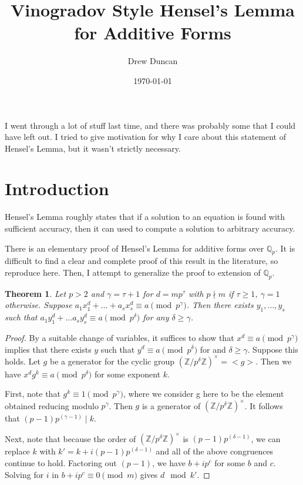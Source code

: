 \documentclass{article}
\title{Vinogradov Style Hensel's Lemma for Additive Forms}
\author{Drew Duncan}
\date{\today}
\newtheorem{theorem}{Theorem}
\begin{document}
\maketitle

I went through a lot of stuff last time, and there was probably some that I could have left out.  I tried to give motivation for why I care about this statement of Hensel's Lemma, but it wasn't strictly necessary.

\section{Introduction}
Hensel's Lemma roughly states that if a solution to an equation is found with sufficient accuracy, then it can used to compute a solution to arbitrary accuracy.

There is an elementary proof of Hensel's Lemma for additive forms over $\mathbb{Q}_p$.  It is difficult to find a clear and complete proof of this result in the literature, so reproduce here.  Then, I attempt to generalize the proof to extension of $\mathbb{Q}_p$.

\begin{theorem}
Let $p>2$ and  $\gamma = \tau+1$ for $d=m p^\tau$ with $p \nmid m$ if $\tau \ge 1$, $\gamma = 1$ otherwise.  Suppose $a_1 x_1^d + \ldots + a_s x_s^d \equiv a \pmod{p^\gamma}$.  Then there exists $y_1, \ldots, y_s$ such that $a_1 y_1^d + \ldots a_s y_s^d \equiv a \pmod{p^\delta}$ for any $\delta \ge \gamma$.
\end{theorem}

\begin{proof}
By a suitable change of variables, it suffices to show that $x^d \equiv a \pmod{p^\gamma}$ implies that there exists $y$ such that $y^d \equiv a \pmod{p^\delta}$ for and $\delta \ge \gamma$.  Suppose this holds.  Let $g$ be a generator for the cyclic group $(\mathbb{Z}/p^\delta\mathbb{Z})^\times = <g>$.  Then we have $x^d g^k \equiv a \pmod{p^\delta}$ for some exponent $k$.

First, note that $g^k \equiv 1 \pmod{p^\gamma}$, where we consider g here to be the element obtained reducing modulo $p^\gamma$.  Then $g$ is a generator of $(\mathbb{Z}/p^\delta\mathbb{Z})^\times$.  It follows that $(p-1)p^{(\gamma-1)} \mid k$.

Next, note that because the order of $(\mathbb{Z}/p^\delta\mathbb{Z})^\times$ is $(p-1)p^{(\delta-1)}$, we can replace $k$ with $k' = k + i(p-1)p^{(\delta-1)}$ and all of the above congruences continue to hold.  Factoring out $(p-1)$, we have $b + ip^c$ for some $b$ and $c$.  Solving for $i$ in $b + ip^c \equiv 0 \pmod{m}$ gives $d \mod k'$.
\end{proof}
\end{document}
